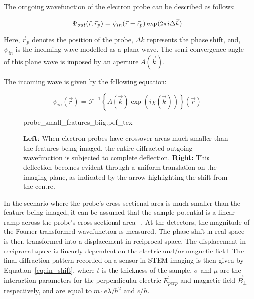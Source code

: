 The outgoing wavefunction of the electron probe can be described as follows:

\begin{equation}
    \Psi_{out}(\vec{r},\vec{r}_p)=\psi_{in}(\vec{r}-\vec{r}_p)\exp(2\pi i \Delta \vec{k})\\
    \label{eq:out_wav}
\end{equation}

Here, $\vec{r}_p$ denotes the position of the probe, $\Delta k$ represents the phase shift, and, $\psi_{in}$ is the incoming wave modelled as a plane wave. The semi-convergence angle of this plane wave is imposed by an aperture $A(\vec{k})$.

The incoming wave is given by the following equation:

\begin{equation}
    \psi_{in}(\vec{r})=\mathcal{F}^{-1}\left\{A(\vec{k})\exp(i\chi(\vec{k}))\right\}(\vec{r})
    \label{eq:in_wav}
\end{equation}




\begin{figure}[h]
	\centering
	\def\svgwidth{1\linewidth}
	{probe_small_features_biig.pdf_tex}
    \caption{\textbf{Left:} When electron probes have crossover areas much smaller than the features being imaged, the entire diffracted outgoing wavefunction is subjected to complete deflection. \textbf{Right:} This deflection becomes evident through a uniform translation on the imaging plane, as indicated by the arrow highlighting the shift from the centre.}
	\label{fig:small_probe}
\end{figure}

In the scenario where the probe's cross-sectional area is much smaller than the feature being imaged, it can be assumed that the sample potential is a linear ramp across the probe's cross-sectional area ~\cite{caoTheoryPracticeElectron2018}. 
%
At the detectors, the magnitude of the Fourier transformed wavefunction is measured. The phase shift in real space is then transformed into a displacement in reciprocal space.
%
The displacement in reciprocal space is linearly dependent on the electric and/or magnetic field. The final diffraction pattern recorded on a sensor in STEM imaging is then given by Equation~\ref{eq:lin_shift}, where $t$ is the thickness of the sample, $\sigma$ and $\mu$ are the interaction parameters for the perpendicular electric $\vec{E}_{perp}$ and magnetic field $\vec{B}_{\perp}$ respectively, and are equal to $m\cdot e \lambda / h^ 2$ and $e / h$. 

